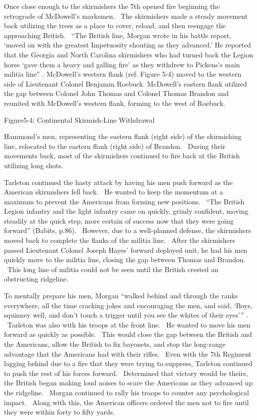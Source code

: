 Once close enough to the skirmishers the 7th opened fire beginning the
retrograde of McDowell’s marksmen.  The skirmishers made a steady movement back
utilizing the trees as a place to cover, reload, and then reengage the
approaching British.  “The British line, Morgan wrote in his battle report,
‘moved on with the greatest Impetuosity shouting as they advanced.’ He reported
that the Georgia and North Carolina skirmishers who had turned back the Legion
horse ‘gave them a heavy and galling fire’ as they withdrew to Pickens’s main
militia line” \cite[p.321]{buchanan_road_1997}.  McDowell’s western flank (ref. Figure 5-4)
moved to the western side of Lieutenant Colonel Benjamin Roebuck.  McDowell’s
eastern flank utilized the gap between Colonel John Thomas and Colonel Thomas
Brandon and reunited with McDowell’s western flank, forming to the west of
Roebuck. 



Figure5-4: Continental Skirmish-Line Withdrawal \cite[p.85]{babits_devil_2001}



Hammond’s men, representing the eastern flank (right side) of the skirmishing
line, relocated to the eastern flank (right side) of Brandon.  During their
movements back, most of the skirmishers continued to fire back at the British
utilizing long shots.

Tarleton continued the hasty attack by having his men push forward as the
American skirmishers fell back.  He wanted to keep the momentum at a maximum to
prevent the Americans from forming new positions.  “The British Legion infantry
and the light infantry came on quickly, grimly confident, moving steadily at the
quick step, more certain of success now that they were going forward” (Babits,
p.86).  However, due to a well-planned defense, the skirmishers moved back to
complete the flanks of the militia line.  After the skirmishers passed
Lieutenant Colonel Joseph Hayes’ forward deployed unit, he had his men quickly
move to the militia line, closing the gap between Thomas and Brandon.  This long
line of militia could not be seen until the British crested an obstructing
ridgeline.  

To mentally prepare his men, Morgan “walked behind and through the ranks
everywhere, all the time cracking jokes and encouraging the men, and said,
‘Boys, squinney well, and don’t touch a trigger until you see the whites of
their eyes’” \cite[p.87]{babits_devil_2001}.  Tarleton was also with his troops at the front
line.  He wanted to move his men forward as quickly as possible.  This would
close the gap between the British and the Americans, allow the British to fix
bayonets, and stop the long-range advantage that the Americans had with their
rifles.  Even with the 7th Regiment lagging behind due to a fire that they were
trying to suppress, Tarleton continued to push the rest of his forces forward.
 Determined that victory would be theirs, the British began making loud noises
to scare the Americans as they advanced up the ridgeline.  Morgan continued to
rally his troops to counter any psychological impact.  Along with this, the
American officers ordered the men not to fire until they were within forty to
fifty yards.  

